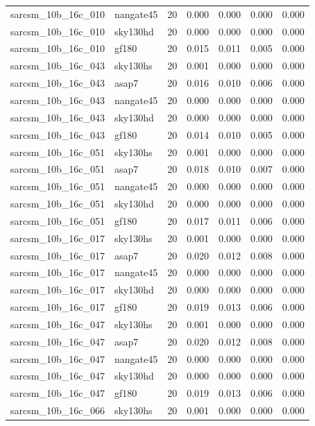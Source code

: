 \begin{tabular}{llrrrrr}
sarcsm\_10b\_16c\_010 & nangate45 & 20 & 0.000 & 0.000 & 0.000 & 0.000 \\
sarcsm\_10b\_16c\_010 & sky130hd & 20 & 0.000 & 0.000 & 0.000 & 0.000 \\
sarcsm\_10b\_16c\_010 & gf180 & 20 & 0.015 & 0.011 & 0.005 & 0.000 \\
sarcsm\_10b\_16c\_043 & sky130hs & 20 & 0.001 & 0.000 & 0.000 & 0.000 \\
sarcsm\_10b\_16c\_043 & asap7 & 20 & 0.016 & 0.010 & 0.006 & 0.000 \\
sarcsm\_10b\_16c\_043 & nangate45 & 20 & 0.000 & 0.000 & 0.000 & 0.000 \\
sarcsm\_10b\_16c\_043 & sky130hd & 20 & 0.000 & 0.000 & 0.000 & 0.000 \\
sarcsm\_10b\_16c\_043 & gf180 & 20 & 0.014 & 0.010 & 0.005 & 0.000 \\
sarcsm\_10b\_16c\_051 & sky130hs & 20 & 0.001 & 0.000 & 0.000 & 0.000 \\
sarcsm\_10b\_16c\_051 & asap7 & 20 & 0.018 & 0.010 & 0.007 & 0.000 \\
sarcsm\_10b\_16c\_051 & nangate45 & 20 & 0.000 & 0.000 & 0.000 & 0.000 \\
sarcsm\_10b\_16c\_051 & sky130hd & 20 & 0.000 & 0.000 & 0.000 & 0.000 \\
sarcsm\_10b\_16c\_051 & gf180 & 20 & 0.017 & 0.011 & 0.006 & 0.000 \\
sarcsm\_10b\_16c\_017 & sky130hs & 20 & 0.001 & 0.000 & 0.000 & 0.000 \\
sarcsm\_10b\_16c\_017 & asap7 & 20 & 0.020 & 0.012 & 0.008 & 0.000 \\
sarcsm\_10b\_16c\_017 & nangate45 & 20 & 0.000 & 0.000 & 0.000 & 0.000 \\
sarcsm\_10b\_16c\_017 & sky130hd & 20 & 0.000 & 0.000 & 0.000 & 0.000 \\
sarcsm\_10b\_16c\_017 & gf180 & 20 & 0.019 & 0.013 & 0.006 & 0.000 \\
sarcsm\_10b\_16c\_047 & sky130hs & 20 & 0.001 & 0.000 & 0.000 & 0.000 \\
sarcsm\_10b\_16c\_047 & asap7 & 20 & 0.020 & 0.012 & 0.008 & 0.000 \\
sarcsm\_10b\_16c\_047 & nangate45 & 20 & 0.000 & 0.000 & 0.000 & 0.000 \\
sarcsm\_10b\_16c\_047 & sky130hd & 20 & 0.000 & 0.000 & 0.000 & 0.000 \\
sarcsm\_10b\_16c\_047 & gf180 & 20 & 0.019 & 0.013 & 0.006 & 0.000 \\
sarcsm\_10b\_16c\_066 & sky130hs & 20 & 0.001 & 0.000 & 0.000 & 0.000 \\

\end{tabular}

